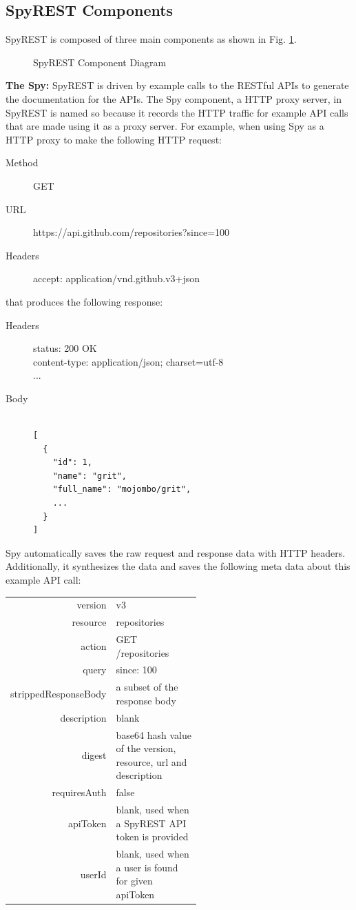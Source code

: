 \documentclass[conference]{IEEEtran}
\begin{document}
\subsection{SpyREST Components} %
SpyREST is composed of three main components as shown in Fig. \ref{fig:components}.

\begin{figure}[htb]
\centering
\def\svgwidth{\linewidth}

\caption{SpyREST Component Diagram}
\label{fig:components}
\end{figure}

\textbf{The Spy:} SpyREST is driven by example calls to the RESTful APIs to generate the documentation for the APIs. The Spy component, a HTTP proxy server, in SpyREST is named so because it records the HTTP traffic for example API calls that are made using it as a proxy server. For example, when using Spy as a HTTP proxy to make the following HTTP request:

\footnotesize
\begin{description}
  \item[Method] GET
  \item[URL] https://api.github.com/repositories?since=100
  \item[Headers] accept: application/vnd.github.v3+json
\end{description}
\normalsize
that produces the following response:
\footnotesize
\begin{description}
  \item[Headers] status: 200 OK \\
content-type: application/json; charset=utf-8 \\
...
  \item[Body]
\begin{lstlisting}

[
  {
    "id": 1,
    "name": "grit",
    "full_name": "mojombo/grit",
    ...
  }
]\end{lstlisting}
\end{description}
\normalsize
Spy automatically saves the raw request and response data with HTTP headers. Additionally, it synthesizes the data and saves the following meta data about this example API call:

\footnotesize
\begin{tabular}{r p{0.55\linewidth}}
  version & v3 \\
  resource & repositories \\
  action & GET /repositories \\
  query & since: 100 \\
  strippedResponseBody & a subset of the response body \\
  description & blank \\
  digest & base64 hash value of the version, resource, url and description \\
  requiresAuth & false \\
  apiToken & blank, used when a SpyREST API token is provided \\
  userId & blank, used when a user is found for given apiToken \\
\end{tabular}
\normalsize
\end{document}
